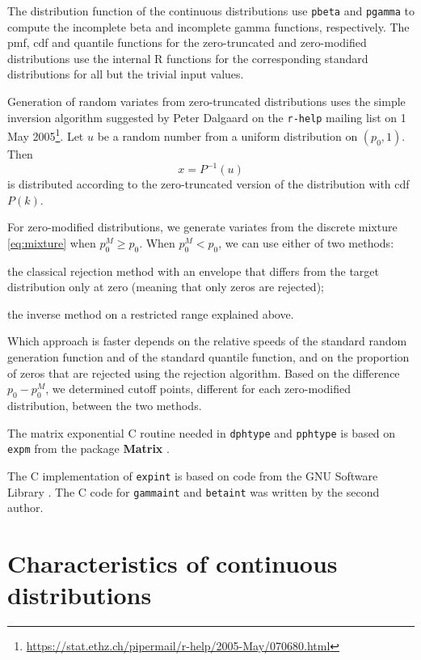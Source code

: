 \documentclass[x11names]{article}
\newcommand{\proglang}[1]{\textsf{#1}}
\newcommand{\pkg}[1]{\textbf{#1}}
\newcommand{\code}[1]{\texttt{#1}}
\begin{document}
The distribution function of the continuous distributions use
\code{pbeta} and \code{pgamma} to compute the incomplete beta and
incomplete gamma functions, respectively. The pmf, cdf and quantile
functions for the zero-truncated and zero-modified distributions use
the internal \proglang{R} functions for the corresponding standard
distributions for all but the trivial input values.

Generation of random variates from zero-truncated distributions uses
the simple inversion algorithm suggested by Peter Dalgaard on the
\code{r-help} mailing list on 1 May 2005\footnote{%
  \url{https://stat.ethz.ch/pipermail/r-help/2005-May/070680.html}}.
Let $u$ be a random number from a uniform distribution on $(p_0, 1)$.
Then
\begin{equation*}
  x = P^{-1}(u)
\end{equation*}
is distributed according to the zero-truncated version of the
distribution with cdf $P(k)$.

For zero-modified distributions, we generate variates from the
discrete mixture \eqref{eq:mixture} when $p_0^M \geq p_0$. When
$p_0^M < p_0$, we can use either of two methods:
\begin{enumerate*}[i)]
\item the classical rejection method with an envelope that differs
  from the target distribution only at zero (meaning that only zeros
  are rejected);
\item the inverse method on a restricted range explained above.
\end{enumerate*}
Which approach is faster depends on the relative speeds of the
standard random generation function and of the standard quantile
function, and on the proportion of zeros that are rejected using the
rejection algorithm. Based on the difference $p_0 - p_0^M$, we
determined cutoff points, different for each zero-modified
distribution, between the two methods.

The matrix exponential \proglang{C} routine needed in \code{dphtype}
and \code{pphtype} is based on \code{expm} from the package
\pkg{Matrix} \citep{Matrix}.

The C implementation of \code{expint} is based on code from the GNU
Software Library \citep{GSL}. The \proglang{C} code for
\code{gammaint} and \code{betaint} was written by the second author.


\appendix

\section{Characteristics of continuous distributions}
\label{sec:app:continuous}
\end{document}
